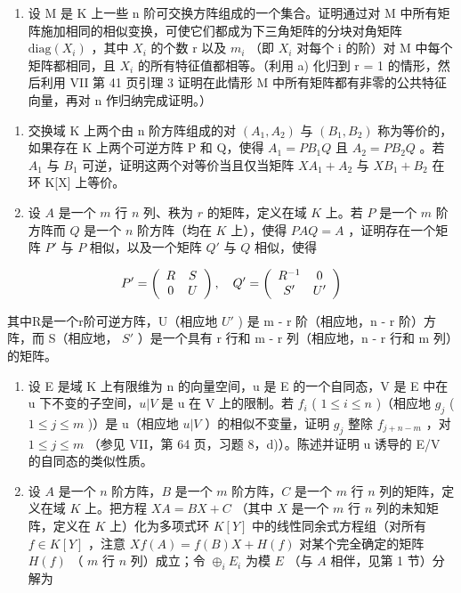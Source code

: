 \begin{enumerate}
\def\labelenumi{\alph{enumi})}
\setcounter{enumi}{1}
\tightlist
\item
  设 M 是 K 上一些 n 阶可交换方阵组成的一个集合。证明通过对 M 中所有矩阵施加相同的相似变换，可使它们都成为下三角矩阵的分块对角矩阵 \(\text{diag}(X_i)\) ，其中 \(X_i\) 的个数 r 以及 \(m_i\) （即 \(X_i\) 对每个 i 的阶）对 M 中每个矩阵都相同，且 \(X_i\) 的所有特征值都相等。（利用 a) 化归到 r = 1 的情形，然后利用 VII 第 41 页引理 3 证明在此情形 M 中所有矩阵都有非零的公共特征向量，再对 n 作归纳完成证明。）
\end{enumerate}

\begin{enumerate}
\def\labelenumi{\arabic{enumi})}
\setcounter{enumi}{5}
\item
  交换域 K 上两个由 n 阶方阵组成的对 \((A_{1}, A_{2})\) 与 \((B_{1}, B_{2})\) 称为等价的，如果存在 K 上两个可逆方阵 P 和 Q，使得 \(A_{1} = PB_{1}Q\) 且 \(A_{2} = PB_{2}Q\) 。若 \(A_{1}\) 与 \(B_{1}\) 可逆，证明这两个对等价当且仅当矩阵 \(XA_{1} + A_{2}\) 与 \(XB_{1} + B_{2}\) 在环 K{[}X{]} 上等价。
\item
  设 \(A\) 是一个 \(m\) 行 \(n\) 列、秩为 \(r\) 的矩阵，定义在域 \(K\) 上。若 \(P\) 是一个 \(m\) 阶方阵而 \(Q\) 是一个 \(n\) 阶方阵（均在 \(K\) 上），使得 \(PAQ = A\) ，证明存在一个矩阵 \(P'\) 与 \(P\) 相似，以及一个矩阵 \(Q'\) 与 \(Q\) 相似，使得
\end{enumerate}

\[
P ^ {\prime} = \left( \begin{array}{c c} R & S \\ 0 & U \end{array} \right), \quad Q ^ {\prime} = \left( \begin{array}{c c} R ^ {- 1} & 0 \\ S ^ {\prime} & U ^ {\prime} \end{array} \right)
\]

其中R是一个r阶可逆方阵，U（相应地 \(U'\) ) 是 m - r 阶（相应地，n - r 阶）方阵，而 S（相应地， \(S'\) ）是一个具有 r 行和 m - r 列（相应地，n - r 行和 m 列）的矩阵。

\begin{enumerate}
\def\labelenumi{\arabic{enumi})}
\setcounter{enumi}{7}
\item
  设 E 是域 K 上有限维为 n 的向量空间，u 是 E 的一个自同态，V 是 E 中在 u 下不变的子空间，\(u|V\) 是 u 在 V 上的限制。若 \(f_{i}\) ( \(1 \leqslant i \leqslant n\) )（相应地 \(g_{j}\) ( \(1 \leqslant j \leqslant m\) )）是 u（相应地 \(u|V\) ）的相似不变量，证明 \(g_{j}\) 整除 \(f_{j+n-m}\) ，对 \(1 \leqslant j \leqslant m\) （参见 VII，第 64 页，习题 8，d)）。陈述并证明 u 诱导的 E/V 的自同态的类似性质。
\item
  设 \(A\) 是一个 \(n\) 阶方阵，\(B\) 是一个 \(m\) 阶方阵，\(C\) 是一个 \(m\) 行 \(n\) 列的矩阵，定义在域 \(K\) 上。把方程 \(X A = B X + C\) （其中 \(X\) 是一个 \(m\) 行 \(n\) 列的未知矩阵，定义在 \(K\) 上）化为多项式环 \(K[Y]\) 中的线性同余式方程组（对所有 \(f \in K[Y]\) ，注意 \(X f(A) = f(B)X + H(f)\) 对某个完全确定的矩阵 \(H(f)\) （ \(m\) 行 \(n\) 列）成立；令 \(\oplus_{i} E_i\) 为模 \(E\) （与 \(A\) 相伴，见第 1 节）分解为
\end{enumerate}

